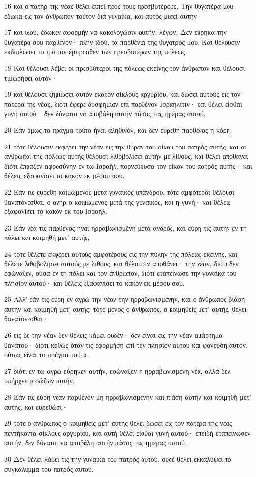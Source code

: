 \par 16 και ο πατήρ της νέας θέλει ειπεί προς τους πρεσβυτέρους, Την θυγατέρα μου έδωκα εις τον άνθρωπον τούτον διά γυναίκα, και αυτός μισεί αυτήν·
\par 17 και ιδού, έδωκεν αφορμήν να κακολογώσιν αυτήν, λέγων, Δεν εύρηκα την θυγατέρα σου παρθένον· πλην ιδού, τα παρθένια της θυγατρός μου. Και θέλουσιν εκδιπλώσει το ιμάτιον έμπροσθεν των πρεσβυτέρων της πόλεως.
\par 18 Και θέλουσι λάβει οι πρεσβύτεροι της πόλεως εκείνης τον άνθρωπον και θέλουσι τιμωρήσει αυτόν·
\par 19 και θέλουσι ζημιώσει αυτόν εκατόν σίκλους αργυρίου, και δώσει αυτούς εις τον πατέρα της νέας, διότι έφερε δυσφημίαν επί παρθένον Ισραηλίτιν· και θέλει είσθαι γυνή αυτού· δεν δύναται να αποβάλη αυτήν πάσας τας ημέρας αυτού.
\par 20 Εάν όμως το πράγμα τούτο ήναι αληθινόν, και δεν ευρεθή παρθένος η κόρη,
\par 21 τότε θέλουσιν εκφέρει την νέαν εις την θύραν του οίκου του πατρός αυτής, και οι άνθρωποι της πόλεως αυτής θέλουσι λιθοβολίσει αυτήν με λίθους, και θέλει αποθάνει διότι έπραξεν αφροσύνην εν τω Ισραήλ, πορνεύουσα τον οίκον του πατρός αυτής· και θέλεις εξαφανίσει το κακόν εκ μέσου σου.
\par 22 Εάν τις ευρεθή κοιμώμενος μετά γυναικός υπάνδρου, τότε αμφότεροι θέλουσι θανατόνεσθαι, ο ανήρ ο κοιμώμενος μετά της γυναικός, και η γυνή· και θέλεις εξαφανίσει το κακόν εκ του Ισραήλ.
\par 23 Εάν νέα τις παρθένος ήναι ηρραβωνισμένη μετά ανδρός, και εύρη τις αυτήν εν τη πόλει και κοιμηθή μετ' αυτής,
\par 24 τότε θέλετε εκφέρει αυτούς αμφοτέρους εις την πύλην της πόλεως εκείνης, και θέλετε λιθοβολήσει αυτούς με λίθους, και θέλουσιν αποθάνει· την νέαν, διότι δεν εφώναξεν, ούσα εν τη πόλει και τον άνθρωπον, διότι εταπείνωσε την γυναίκα του πλησίον αυτού· και θέλεις εξαφανίσει το κακόν εκ μέσου σου.
\par 25 Αλλ' εάν τις εύρη εν αγρώ την νέαν την ηρραβωνισμένην, και ο άνθρωπος βιάση αυτήν και κοιμηθή μετ' αυτής, τότε μόνος ο άνθρωπος, ο κοιμηθείς μετ' αυτής, θέλει θανατόνεσθαι·
\par 26 εις δε την νέαν δεν θέλεις κάμει ουδέν· δεν είναι εις την νέαν αμάρτημα θανάτου· διότι καθώς όταν τις εφορμήση επί τον πλησίον αυτού και φονεύση αυτόν, ούτως είναι το πράγμα τούτο·
\par 27 διότι εν τω αγρώ εύρηκεν αυτήν, εφώναξεν η ηρραβωνισμένη νέα, αλλά δεν υπήρχεν ο σώζων αυτήν.
\par 28 Εάν τις εύρη νέαν παρθένον μη ηρραβωνισμένην και πιάση αυτήν και κοιμηθή μετ' αυτής, και ευρεθώσι·
\par 29 τότε ο άνθρωπος ο κοιμηθείς μετ' αυτής θέλει δώσει εις τον πατέρα της νέας πεντήκοντα σίκλους αργυρίου, και αυτή θέλει είσθαι γυνή αυτού· επειδή εταπείνωσεν αυτήν, δεν δύναται να αποβάλη αυτήν πάσας τας ημέρας αυτού.
\par 30 Δεν θέλει λάβει τις την γυναίκα του πατρός αυτού, ουδέ θέλει εκκαλύψει το συγκάλυμμα του πατρός αυτού.

